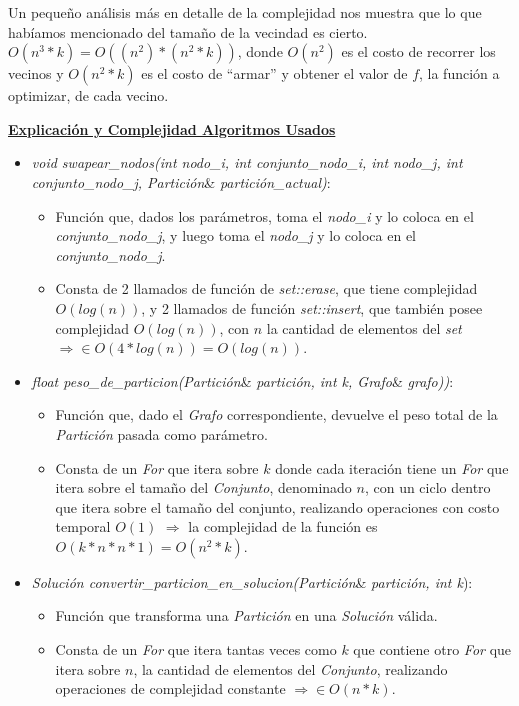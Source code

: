 \documentclass[10pt,a4paper]{article}
\begin{document}
Un pequeño análisis más en detalle de la complejidad nos muestra que lo que habíamos mencionado del tamaño de la vecindad es cierto. $O(n^3*k) = O((n^2)*(n^2*k))$, donde $O(n^2)$ es el costo de recorrer los vecinos y $O(n^2*k)$ es el costo de ``armar'' y obtener el valor de $f$, la función a optimizar, de cada vecino.

\textbf{\underline{Explicación y Complejidad Algoritmos Usados}}

\begin{itemize}
\item \textit{void swapear\_nodos(int nodo\_i, int conjunto\_nodo\_i, int nodo\_j, int conjunto\_nodo\_j, Partición}\& \textit{partición\_actual)}:
\begin{itemize}
\item Función que, dados los parámetros, toma el \textit{nodo\_i} y lo coloca en el \textit{conjunto\_nodo\_j}, y luego toma el \textit{nodo\_j} y lo coloca en el \textit{conjunto\_nodo\_j}.

\item Consta de 2 llamados de función de \textit{set::erase}, que tiene complejidad $O(log(n))$, y 2 llamados de función \textit{set::insert}, que también posee complejidad $O(log(n))$, con $n$ la cantidad de elementos del \textit{set}\newline $\Rightarrow \in O(4*log(n)) = O(log(n))$.
\end{itemize}
\item \textit{float peso\_de\_particion(Partición}\& \textit{partición, int k, Grafo}\& \textit{grafo))}:
\begin{itemize}
\item Función que, dado el \textit{Grafo} correspondiente, devuelve el peso total de la \textit{Partición} pasada como parámetro.
\item Consta de un \textit{For} que itera sobre $k$ donde cada iteración tiene un \textit{For} que itera sobre el tamaño del \textit{Conjunto}, denominado $n$, con un ciclo dentro que itera sobre el tamaño del conjunto, realizando operaciones con costo temporal $O(1)$ $\Rightarrow$ la complejidad de la función es $O(k*n*n*1) = O(n^2*k)$.
\end{itemize}
\item \textit{Solución convertir\_particion\_en\_solucion(Partición}\& \textit{partición, int k}):
\begin{itemize}
\item Función que transforma una \textit{Partición} en una \textit{Solución} válida.
\item Consta de un \textit{For} que itera tantas veces como $k$ que contiene otro \textit{For} que itera sobre $n$, la cantidad de elementos del \textit{Conjunto}, realizando operaciones de complejidad constante $\Rightarrow \in O(n*k)$.
\end{itemize}
\end{itemize}
\end{document}
